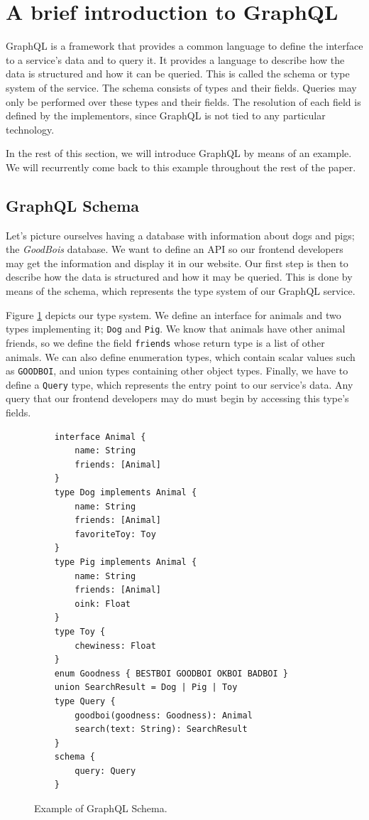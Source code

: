 
\section{A brief introduction to GraphQL}\label{sec:bg}

GraphQL is a framework that provides a common language to define the interface to a service's data and to query it.
It provides a language to describe how the data is structured and how it can be queried. This is called the schema or type system of the service. The schema consists of types and their fields. Queries may only be performed over these types and their fields. The resolution of each field is defined by the implementors, since GraphQL is not tied to any particular technology. 

In the rest of this section, we will introduce GraphQL by means of an example. We will recurrently come back to this example throughout the rest of the paper.

\subsection*{GraphQL Schema}

Let's picture ourselves having a database with information about dogs and pigs; the \textit{GoodBois} database. We want to define an API so our frontend developers may get the information and display it in our website. Our first step is then to describe how the data is structured and how it may be queried. This is done by means of the schema, which represents the type system of our GraphQL service.

Figure \ref{fig:schema_ex} depicts our type system. We define an interface for animals and two types implementing it; \texttt{Dog} and \texttt{Pig}. We know that animals have other animal friends, so we define the field \texttt{friends} whose return type is a list of other animals. We can also define enumeration types, which contain scalar values such as \texttt{GOODBOI}, and union types containing other object types. Finally, we have to define a \texttt{Query} type, which represents the entry point to our service's data. Any query that our frontend developers may do must begin by accessing this type's fields.

\begin{figure}
    \centering
    \begin{verbatim}
    interface Animal {
        name: String
        friends: [Animal]
    }
    type Dog implements Animal {
        name: String
        friends: [Animal]
        favoriteToy: Toy
    }
    type Pig implements Animal {
        name: String
        friends: [Animal]
        oink: Float
    }
    type Toy {
        chewiness: Float
    }
    enum Goodness { BESTBOI GOODBOI OKBOI BADBOI } 
    union SearchResult = Dog | Pig | Toy
    type Query {
        goodboi(goodness: Goodness): Animal
        search(text: String): SearchResult
    }
    schema {
        query: Query
    }
    \end{verbatim}
    \caption{Example of GraphQL Schema.}
    \label{fig:schema_ex}
\end{figure}

